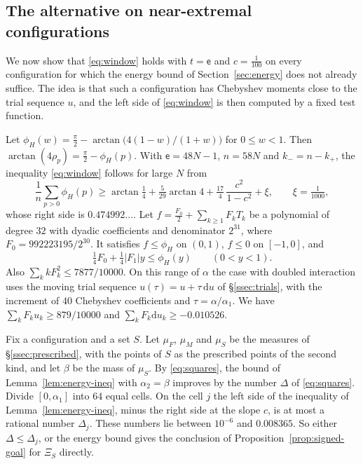 \subsection{The alternative on near-extremal configurations}\label{ssec:alternative}
We now show that \eqref{eq:window} holds with $t=\mathsf e$ and $c=\frac1{100}$ on every configuration for which the
energy bound of Section~\ref{sec:energy} does not already suffice. The idea is that such a configuration has
Chebyshev moments close to the trial sequence $u$, and the left side of \eqref{eq:window} is then computed by a
fixed test function.

Let $\phi_H(w)=\frac\pi2-\arctan\bigl(4(1-w)/(1+w)\bigr)$ for $0\le w<1$. Then $\arctan(4\rho_p)=\frac\pi2-\phi_H(p)$.
With $\mathsf e=48N-1$, $n=58N$ and $k_-=n-k_+$, the inequality \eqref{eq:window} follows for large $N$ from
\begin{equation}\label{eq:phaseneed}
 \frac1n\sum_{p>0}\phi_H(p)\ge\arctan\tfrac14+\tfrac5{29}\arctan4+\tfrac{17}4\,\frac{c^2}{1-c^2}+\xi,\qquad \xi=\tfrac1{1000},
\end{equation}
whose right side is $0.474992\ldots$. Let $f=\frac{F_0}2+\sum_{k\ge1}F_kT_k$ be a polynomial of degree $32$ with
dyadic coefficients and denominator $2^{31}$, where $F_0=992223195/2^{30}$. 
It satisfies $f\le\phi_H$ on $(0,1)$, $f\le0$ on $[-1,0]$, and
\begin{equation}\label{eq:testS}
 \tfrac14F_0+\tfrac14|F_1|y\le\phi_H(y)\qquad(0<y<1).
\end{equation}
Also $\sum_kkF_k^2\le7877/10000$. On this range of $\alpha$ the case with doubled interaction uses the moving trial
sequence $u(\tau)=u+\tau\,\mathrm du$ of \S\ref{ssec:trials}, with the increment of $40$ Chebyshev coefficients and
$\tau=\alpha/\alpha_1$. We have $\sum_kF_ku_k\ge879/10000$ and $\sum_kF_k\mathrm du_k\ge-0.010526$.

Fix a configuration and a set $S$. Let $\mu_F$, $\mu_M$ and $\mu_S$ be the measures of \S\ref{ssec:prescribed}, with the points of $S$ as the
prescribed points of the second kind, and let $\beta$ be the mass of $\mu_S$. By \eqref{eq:squares}, the bound of Lemma~\ref{lem:energy-ineq} with
$\alpha_2=\beta$ improves by the number $\Delta$ of \eqref{eq:squares}. Divide $[0,\alpha_1]$ into $64$ equal cells. On the cell $j$ the
left side of the inequality of Lemma~\ref{lem:energy-ineq}, minus the right side at the slope $c$, is at most a rational number $\Delta_j$.
These numbers lie between $10^{-6}$ and $0.008365$. So either $\Delta\le\Delta_j$, or the energy bound gives the conclusion of
Proposition~\ref{prop:signed-goal} for $\Xi_S$ directly.


